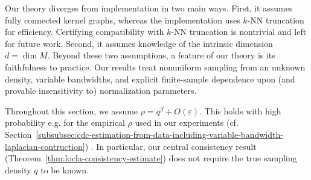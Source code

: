 \documentclass{article}
\theoremstyle{remark}
\theoremstyle{plain}
\begin{document}
Our theory diverges from implementation in two main ways. First, it assumes fully connected kernel graphs, whereas the implementation uses \(k\)-NN truncation for efficiency. Certifying compatibility with \( k \)-NN truncation is nontrivial and left for future work.
Second, it assumes knowledge of the intrinsic dimension \(d=\dim M\). Beyond these two assumptions, a feature of our theory is its faithfulness to practice. Our results treat nonuniform sampling from an unknown density, variable bandwidths, and explicit finite-sample dependence upon (and provable insensitivity to) normalization parameters. 





Throughout this section, we assume \( \rho=q^\beta + O(\varepsilon) \). This holds with high probability e.g. for the empirical \( \rho \) used in our experiments (cf. Section~\ref{subsubsec:cdc-estimation-from-data-including-variable-bandwidth-laplacian-contruction}) \cite{Berry2016}. In particular, our central consistency result (Theorem~\ref{thm:locla-consistency-estimate}) does not require the true sampling density \( q \) to be known. 

\end{document}
